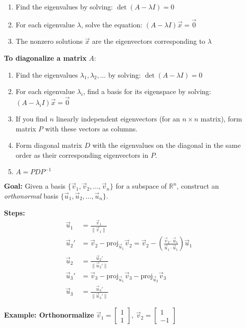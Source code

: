 \documentclass{article}
\begin{document}
\begin{multicols*}{2}
\begin{enumerate}
    \item Find the eigenvalues by solving: $\det(A - \lambda I) = 0$
    \item For each eigenvalue $\lambda$, solve the equation: $(A - \lambda I)\vec{x} = \vec{0}$
    \item The nonzero solutions $\vec{x}$ are the eigenvectors corresponding to $\lambda$
\end{enumerate}
\textbf{To diagonalize a matrix } $A$:
\begin{enumerate}
    \item Find the eigenvalues $\lambda_1, \lambda_2, \dots$ by solving: $\det(A - \lambda I) = 0$
    \item For each eigenvalue $\lambda_i$, find a basis for its eigenspace by solving: $(A - \lambda_i I)\vec{x} = \vec{0}$
    \item If you find $n$ linearly independent eigenvectors (for an $n \times n$ matrix), form matrix $P$ with these vectors as columns.
    \item Form diagonal matrix $D$ with the eigenvalues on the diagonal in the same order as their corresponding eigenvectors in $P$.
    \item $A = P D P^{-1}$
\end{enumerate}
\columnbreak \pagebreak \textbf{Goal:} Given a basis $\{ \vec{v}_1, \vec{v}_2, \dots, \vec{v}_n \}$ for a subspace of $\mathbb{R}^n$, construct an \emph{orthonormal} basis $\{ \vec{u}_1, \vec{u}_2, \dots, \vec{u}_n \}$.

\textbf{Steps:}
\begin{align*}
\vec{u}_1 &= \frac{\vec{v}_1}{\|\vec{v}_1\|} \\
\vec{u}_2' &= \vec{v}_2 - \text{proj}_{\vec{u}_1} \vec{v}_2 
= \vec{v}_2 - \left( \frac{\vec{v}_2 \cdot \vec{u}_1}{\vec{u}_1 \cdot \vec{u}_1} \right)\vec{u}_1 \\
\vec{u}_2 &= \frac{\vec{u}_2'}{\|\vec{u}_2'\|} \\
\vec{u}_3' &= \vec{v}_3 - \text{proj}_{\vec{u}_1} \vec{v}_3 - \text{proj}_{\vec{u}_2} \vec{v}_3 \\
\vec{u}_3 &= \frac{\vec{u}_3'}{\|\vec{u}_3'\|} 
\end{align*}

\textbf{Example: Orthonormalize } $\vec{v}_1 = \begin{bmatrix} 1 \\ 1 \end{bmatrix}, \ 
\vec{v}_2 = \begin{bmatrix} 1 \\ -1 \end{bmatrix}$


\end{multicols*}
\end{document}
